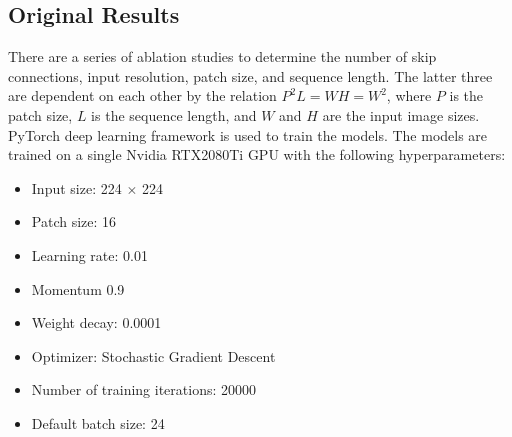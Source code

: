 \documentclass{IEEEtran}
\begin{document}
\vfill\null\newpage

\begin{table}[h]
\end{table}

\subsection{Original Results \cite{chen2021transunet}}

There are a series of ablation studies to determine the number of skip connections, input resolution, patch size, and sequence length. The latter three are dependent on each other by the relation $P^2L = WH = W^2$, where $P$ is the patch size, $L$ is the sequence length, and $W$ and $H$ are the input image sizes.
PyTorch \cite{paszke2017automatic} deep learning framework is used to train the models.
The models are trained on a single Nvidia RTX2080Ti GPU with the following hyperparameters:
\begin{itemize}
    \item Input size: 224 $\times$ 224
    \item Patch size: 16
    \item Learning rate: 0.01
    \item Momentum 0.9 
    \item Weight decay: 0.0001
    \item Optimizer: Stochastic Gradient Descent
    \item Number of training iterations: 20000
    \item Default batch size: 24
\end{itemize}
\end{document}
